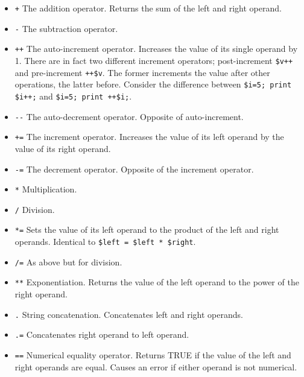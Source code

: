 \documentclass[11pt]{article}
\begin{document}
\begin{itemize}
\item \texttt{+} The addition operator. Returns the sum of the left and right
operand.

\item \texttt{-} The subtraction operator.

\item \texttt{++} The auto-increment operator. Increases the value of its single
operand by 1. There are in fact two different increment operators;
post-increment \texttt{\$v++} and pre-increment \texttt{++\$v}. The former increments
the value after other operations, the latter before. Consider the
difference between \texttt{\$i=5; print \$i++;} and \texttt{\$i=5; print ++\$i;}.

\item \texttt{-{}-} The auto-decrement operator. Opposite of auto-increment.

\item \texttt{+=} The increment operator. Increases the value of its left operand
by the value of its right operand.

\item \texttt{-=} The decrement operator. Opposite of the increment operator.

\item \texttt{*} Multiplication.

\item \texttt{/} Division.

\item \texttt{*=} Sets the value of its left operand to the product of the left
and right operands. Identical to \texttt{\$left = \$left * \$right}.

\item \texttt{/=} As above but for division.

\item \texttt{**} Exponentiation. Returns the value of the left operand to the
power of the right operand.

\item \texttt{.} String concatenation. Concatenates left and right operands.

\item \texttt{.=} Concatenates right operand to left operand.

\item \texttt{==} Numerical equality operator. Returns TRUE if the value of the
left and right operands are equal. Causes an error if either
operand is not numerical.


\end{itemize}
\end{document}
